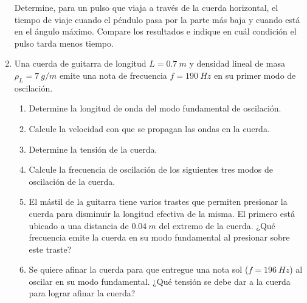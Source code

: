 \documentclass[letterpaper,11pt]{article}
\begin{document}
\begin{enumerate}
Determine,  para  un  pulso  que  viaja  a  través  de  la  cuerda  horizontal,  el  tiempo  de  viaje  cuando  el  péndulo pasa  por  la  parte  más  baja  y  cuando  está  en  el  ángulo  máximo. Compare  los  resultados  e  indique en  cuál  condición  el  pulso  tarda  menos  tiempo.

\item Una cuerda de guitarra de longitud $L= \SI{0.7}{m}$ y densidad lineal de masa $\rho_L = \SI{7}{g/m}$ emite una nota de frecuencia $f=\SI{190}{Hz}$ en su primer modo de oscilación.
    \begin{enumerate}
        \item Determine la longitud de onda del modo fundamental de oscilación.
        \item Calcule la velocidad con que se propagan las ondas en la cuerda.
        \item Determine la tensión de la cuerda.
        \item Calcule la frecuencia de oscilación de los siguientes tres modos de oscilación de la cuerda.
        \item El mástil de la guitarra tiene varios trastes que permiten presionar la cuerda para disminuir la longitud efectiva de la misma. El primero está ubicado a una distancia de $\SI{0.04}{m}$ del extremo de la cuerda. ¿Qué frecuencia emite la cuerda en su modo fundamental al presionar sobre este traste?
        \item Se quiere afinar la cuerda para que entregue una nota sol ($f = \SI{196}{Hz}$) al oscilar en su modo fundamental. ¿Qué tensión se debe dar a la cuerda para lograr afinar la cuerda?
    \end{enumerate}

\end{enumerate}
\end{document}
